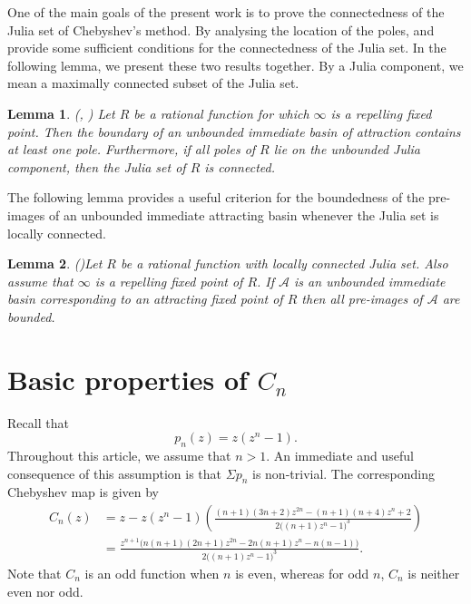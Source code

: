 \documentclass[12pt]{article}
\newtheorem{lem}{Lemma}[section]
\begin{document}
	One of the main goals of the present work is to prove the connectedness of the Julia set of Chebyshev's method. By analysing the location of the poles, \cite[Lemma~4.3]{Nayak-Pal2022} and \cite[Lemma~3.5]{Sym_dyn} provide some sufficient conditions for the connectedness of the Julia set. In the following lemma, we present these two results together. By a Julia component, we mean a maximally connected subset of the Julia set.
	\begin{lem}(\cite[Lemma~4.3]{Nayak-Pal2022}, \cite[Lemma~3.5]{Sym_dyn}) \label{Jconnected}
		Let $R$ be a rational function for which $\infty$ is a repelling fixed point. Then the boundary of an unbounded immediate basin of attraction contains at least one pole. Furthermore, if all poles of $R$ lie on the unbounded Julia component, then the Julia set of $R$ is connected.
	\end{lem}
	The following lemma provides a useful criterion for the boundedness of the pre-images of an unbounded immediate attracting basin whenever the Julia set is locally connected.
	\begin{lem}(\cite[Lemma~3.3]{Sym_dyn})\label{bdd_pre-im}
		Let $R$ be a rational function with locally connected Julia set. Also assume that $\infty$ is a repelling fixed point of $R$. If $\mathcal{A}$ is an unbounded immediate basin corresponding to an attracting fixed point of $R$ then all pre-images of $\mathcal{A}$ are bounded.
	\end{lem}
	


	\section{Basic properties of  $C_n$}\label{S3_Fun-prop}
Recall that $$p_n(z)=z(z^n-1).$$
Throughout this article, we assume that $n>1$. An immediate and useful consequence of this assumption is that  $\Sigma p_n$ is non-trivial. The corresponding Chebyshev map is given by
	\begin{align}
		C_n(z) &  = z-z(z^n-1)\left(\frac{(n+1)(3n+2) z^{2n}-(n+1)(n+4) z^n+2}
		{2\big((n+1)z^n-1\big)^3}\right) \label{eq:Cp}\\
		& =\frac{z^{n+1}\big(n(n+1)(2n+1)z^{2n}-2n(n+1)z^n-n(n-1)\big)}
		{2\big((n+1)z^n-1\big)^3}.  \label{eq:Cp2}
	\end{align}
Note that $C_n$ is an odd function when $n$ is even, whereas for odd $n$, $C_n$ is neither even nor odd.
\end{document}
